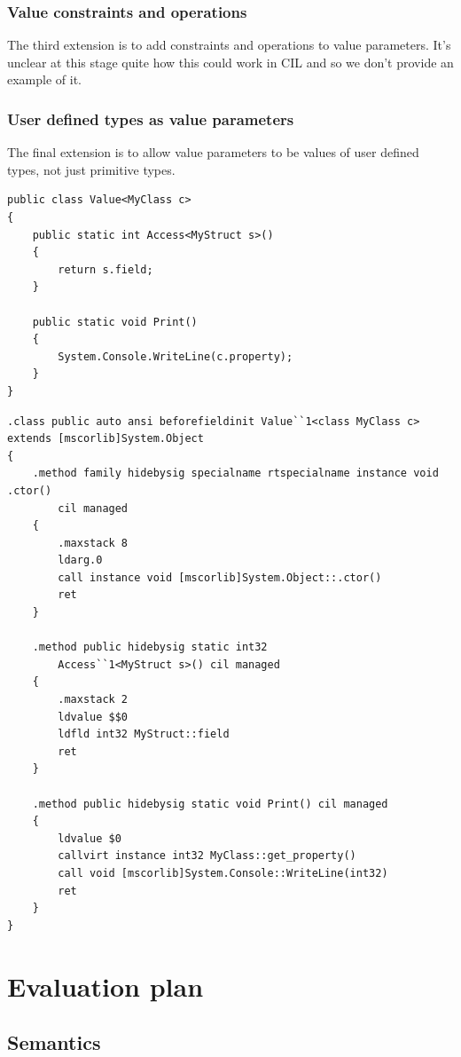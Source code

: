 \documentclass[english]{report}
\begin{document}
\subsection{Value constraints and operations}

The third extension is to add constraints and operations to value
parameters. It's unclear at this stage quite how this could work in
CIL and so we don't provide an example of it.


\subsection{User defined types as value parameters}

The final extension is to allow value parameters to be values of user
defined types, not just primitive types.

\begin{lstlisting}[caption={User defined types as value parameters in extended C\#},keywordstyle={\color{blue}},language=sharpc]
public class Value<MyClass c>
{
	public static int Access<MyStruct s>()
	{
		return s.field;
	}

	public static void Print()
	{
		System.Console.WriteLine(c.property);
	}
}
\end{lstlisting}


\begin{lstlisting}[caption={Corresponding CIL}]
.class public auto ansi beforefieldinit Value``1<class MyClass c>
extends [mscorlib]System.Object 
{
	.method family hidebysig specialname rtspecialname instance void .ctor() 
		cil managed
	{
		.maxstack 8
		ldarg.0
		call instance void [mscorlib]System.Object::.ctor()
		ret
	}

	.method public hidebysig static int32 
		Access``1<MyStruct s>() cil managed
	{
		.maxstack 2
		ldvalue $$0
		ldfld int32 MyStruct::field
		ret
	}

	.method public hidebysig static void Print() cil managed
	{
		ldvalue $0
		callvirt instance int32 MyClass::get_property()    
		call void [mscorlib]System.Console::WriteLine(int32)
		ret
	}
}
\end{lstlisting}



\chapter{Evaluation plan}


\section{Semantics}
\end{document}
